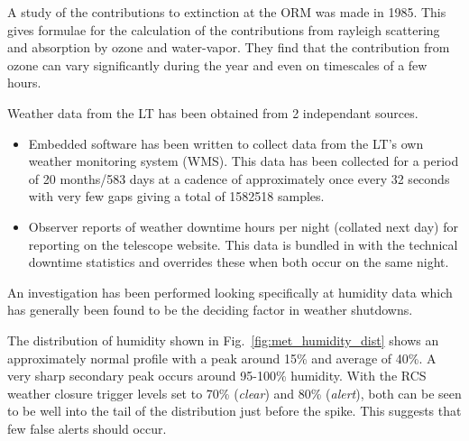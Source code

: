 \documentclass[12pt,a4paper]{article}
\begin{document}
A study of the contributions to extinction at the ORM \citep{lapalma31}was made in 1985. This gives formulae for the calculation of the contributions from rayleigh scattering and absorption by ozone and water-vapor. They find that the contribution from ozone can vary significantly during the year and even on timescales of a few hours.

Weather data from the LT  has been obtained from 2 independant sources.
\begin{itemize}
\item Embedded software has been written to collect data from the LT's own weather monitoring system (WMS). This data has been collected for a period of 20 months/583 days at a cadence of approximately once every 32 seconds with very few gaps giving a total of 1582518 samples.
\item Observer reports of weather downtime hours per night (collated next day) for reporting on the telescope website. This data is bundled in with the technical downtime statistics and overrides these when both occur on the same night.
\end{itemize}

An investigation has been performed looking specifically at humidity data which has generally been found to be the deciding factor in weather shutdowns.

The distribution of humidity shown in Fig.~\ref{fig:met_humidity_dist} shows an approximately normal profile with a peak around 15\% and average of 40\%. A very sharp secondary peak occurs around 95-100\% humidity. With the RCS weather closure trigger levels set to 70\% (\emph{clear}) and 80\% (\emph{alert}), both can be seen to be well into the tail of the distribution just before the spike. This suggests that few false alerts should occur.
\end{document}
